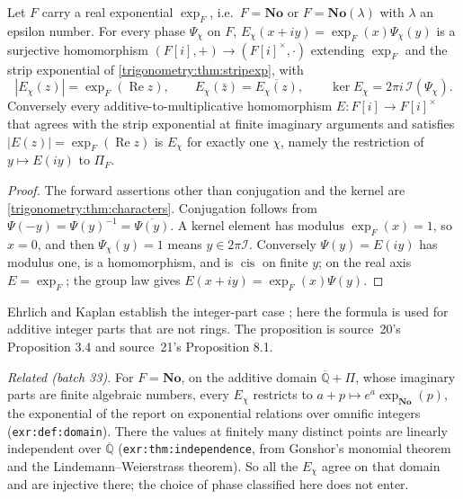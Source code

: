 \documentclass[11pt,letterpaper]{article}
\numberwithin{equation}{section}
\theoremstyle{definition}
\theoremstyle{remark}
\newcommand{\No}{\mathbf{No}}
\newcommand{\re}{\operatorname{Re}}
\newcommand{\cis}{\operatorname{cis}}
\newcommand{\cI}{\mathcal I}
\begin{document}
\begin{proposition}\label{trigonometry:per:prop:exponentials}
Let $F$ carry a real exponential $\exp_F$, i.e.\ $F=\No$ or $F=\No(\lambda)$ with $\lambda$ an epsilon
number. For every phase $\Psi_\chi$ on $F$, $E_\chi(x+iy)=\exp_F(x)\Psi_\chi(y)$ is a surjective
homomorphism $(F[i],+)\to(F[i]^\times,\cdot)$ extending $\exp_F$ and the strip exponential of
\cref{trigonometry:thm:stripexp}, with
\begin{equation}\label{trigonometry:per:eq:explaws}
 |E_\chi(z)|=\exp_F(\re z),\qquad E_\chi(\bar z)=\overline{E_\chi(z)},\qquad
 \ker E_\chi=2\pi i\,\cI(\Psi_\chi).
\end{equation}
Conversely every additive-to-multiplicative homomorphism $E:F[i]\to F[i]^\times$ that agrees with the
strip exponential at finite imaginary arguments and satisfies $|E(z)|=\exp_F(\re z)$ is $E_\chi$ for
exactly one $\chi$, namely the restriction of $y\mapsto E(iy)$ to $\Pi_F$.
\end{proposition}
\begin{proof}
The forward assertions other than conjugation and the kernel are \cref{trigonometry:thm:characters}.
Conjugation follows from $\Psi(-y)=\Psi(y)^{-1}=\overline{\Psi(y)}$. A kernel element has modulus
$\exp_F(x)=1$, so $x=0$, and then $\Psi_\chi(y)=1$ means $y\in2\pi\cI$. Conversely $\Psi(y)=E(iy)$
has modulus one, is a homomorphism, and is $\cis$ on finite $y$; on the real axis $E=\exp_F$; the
group law gives $E(x+iy)=\exp_F(x)\Psi(y)$.
\end{proof}
Ehrlich and Kaplan establish the integer-part case \cite[Proposition 11.2]{EK}; here the formula is
used for additive integer parts that are not rings. The proposition is source~20's Proposition 3.4
and source~21's Proposition 8.1.

\emph{Related (batch 33).} For $F=\No$, on the additive domain $\overline{\mathbb Q}+\Pi$, whose imaginary
parts are finite algebraic numbers, every $E_\chi$ restricts to $a+p\mapsto e^a\exp_{\No}(p)$, the
exponential of the report on exponential relations over omnific integers (\texttt{exr:def:domain}).
There the values at finitely many distinct points are linearly independent over $\overline{\mathbb Q}$
(\texttt{exr:thm:independence}, from Gonshor's monomial theorem and the Lindemann--Weierstrass
theorem). So all the $E_\chi$ agree on that domain and are injective there; the choice of phase
classified here does not enter.
\end{document}
